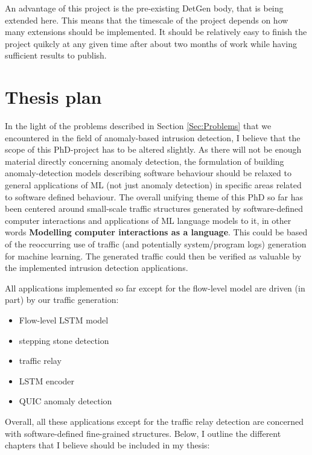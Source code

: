 \documentclass[a4paper,12pt,twoside]{article}
\begin{document}
An advantage of this project is the pre-existing DetGen body, that is being extended here. This means that the timescale of the project depends on how many extensions should be implemented. It should be relatively easy to finish the project quikcly at any given time after about two months of work while having sufficient results to publish. 


\section{Thesis plan}

In the light of the problems described in Section \ref{Sec:Problems} that we encountered in the field of anomaly-based intrusion detection, I believe that the scope of this PhD-project has to be altered slightly. As there will not be enough material directly concerning anomaly detection, the formulation of building anomaly-detection models describing software behaviour should be relaxed to general applications of ML (not just anomaly detection) in specific areas related to software defined behaviour. 
The overall unifying theme of this PhD so far has been centered around small-scale traffic structures generated by software-defined computer interactions and applications of ML language models to it, in other words \textbf{Modelling computer interactions as a language}.
This could be based of the reoccurring use of traffic (and potentially system/program logs) generation for machine learning. The generated traffic could then be verified as valuable by the implemented intrusion detection applications.

All applications implemented so far except for the flow-level model are driven (in part) by our traffic generation:
\begin{itemize}
\item Flow-level LSTM model

\item stepping stone detection
\item traffic relay
\item LSTM encoder
\item QUIC anomaly detection
\end{itemize}

Overall, all these applications except for the traffic relay detection are concerned with software-defined fine-grained structures. Below, I outline the different chapters that I believe should be included in my thesis:
\end{document}
